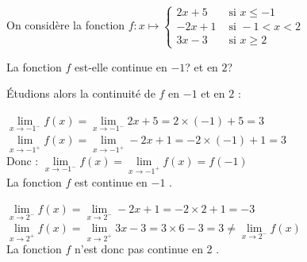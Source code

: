 \documentclass[11pt,a4paper]{article}  %
\begin{document}
	\graphicspath{{images/}}
	
	\begin{center}
		
	\end{center}
%	


On considère la fonction $f: x \mapsto \begin{cases}2 x+5 & \text { si } x \leqslant-1 \\ -2 x+1 & \text { si }-1<x<2  \\ 3x-3 & \text { si } x \geqslant 2\end{cases}$

La fonction $f$ est-elle continue en $-1$? et en $2$?

\begin{corrBox}
	Étudions alors la continuité de \(f\) en $-1$ et en $2$ :
	
	\begin{itemMet}
		\item \(\lim \limits_{x \rightarrow -1^{-}} f(x)=\lim \limits_{x \rightarrow -1^{-}}2x+5=2\times (-1)+5=3\)\\
		\(\lim \limits_{x \rightarrow -1^{+}} f(x)=\lim \limits_{x \rightarrow -1^{+}} -2x+1=-2\times (-1)+1=3\)\\
		Donc : \(\lim \limits_{x \rightarrow -1^{-}} f(x)=\lim \limits_{x \rightarrow -1^{+}} f(x)=f(-1)\)\\
		La fonction \(f\) est continue en $-1$ .
		\item \(\lim \limits_{x \rightarrow 2^{-}} f(x)=\lim \limits_{x \rightarrow 2^{-}} -2x+1=-2\times 2+1=-3\)\\
		\(\lim \limits_{x \rightarrow 2^{+}} f(x)=\lim \limits_{x \rightarrow 2^{+}}3x-3=3 \times 6-3=3\neq\lim \limits_{x \rightarrow 2^{-}} f(x)\)\\
		La fonction \(f\) n'est donc pas continue en 2 .\\
	\end{itemMet}	
\end{corrBox}
\end{document}
